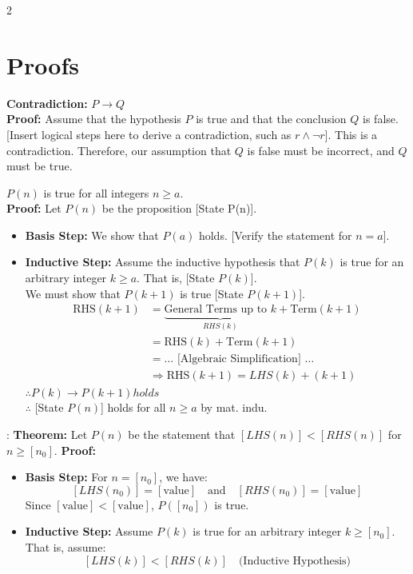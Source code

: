 \documentclass[10pt]{article}
\begin{document}
\begin{multicols*}{2}
\section{Proofs}
\textbf{Contradiction:} $P \to Q$ \\
\textbf{Proof:} 
Assume that the hypothesis $P$ is true and that the conclusion $Q$ is false. 
[Insert logical steps here to derive a contradiction, such as $r \land \neg r$].
This is a contradiction. 
Therefore, our assumption that $Q$ is false must be incorrect, and $Q$ must be true.

\textbf{} $P(n)$ is true for all integers $n \geq a$. \\
\textbf{Proof:} 
Let $P(n)$ be the proposition [State P(n)].
\begin{itemize}
    \item \textbf{Basis Step:} We show that $P(a)$ holds. 
    [Verify the statement for $n=a$].
    \item \textbf{Inductive Step:} Assume the inductive hypothesis that $P(k)$ is true for an arbitrary integer $k\geq a$. That is, [State $P(k)$].\\
    We must show that $P(k+1)$ is true [State $P(k+1)$]. 
    \begin{align*}
    \text{RHS}(k+1) &= \underbrace{\text{General Terms up to } k}_{RHS(k)} + \text{Term}(k+1) \\
    &= \text{RHS}(k) + \text{Term}(k+1) \\
    &= \dots \text{ [Algebraic Simplification] } \dots \\
    &\Rightarrow \text{RHS}(k+1) = LHS(k) + (k+1)
\end{align*}
$\therefore P(k) \to P(k+1) holds$\\
$\therefore$ [State $P(n)$] holds for all $n\geq a$ by mat. indu.
\end{itemize}
\textbf{}:
\textbf{Theorem:} Let $P(n)$ be the statement that $[LHS(n)] < [RHS(n)]$ for $n \geq [n_0]$.
\textbf{Proof:}
\begin{itemize}
    \item \textbf{Basis Step:} For $n = [n_0]$, we have:
    \[ [LHS(n_0)] = [\text{value}] \quad \text{and} \quad [RHS(n_0)] = [\text{value}] \]
    Since $[\text{value}] < [\text{value}]$, $P([n_0])$ is true.

    \item \textbf{Inductive Step:} Assume $P(k)$ is true for an arbitrary integer $k \geq [n_0]$. 
    That is, assume:
    \[ [LHS(k)] < [RHS(k)] \quad \text{(Inductive Hypothesis)} \]
    

\end{itemize}
\end{multicols*}
\end{document}

